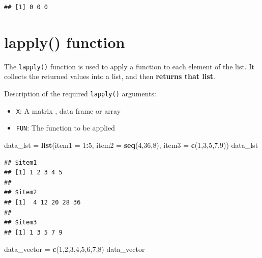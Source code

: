 \documentclass[
]{book}
\newenvironment{Shaded}{\begin{snugshade}}{\end{snugshade}}
\newcommand{\DataTypeTok}[1]{\textcolor[rgb]{0.13,0.29,0.53}{#1}}
\newcommand{\DecValTok}[1]{\textcolor[rgb]{0.00,0.00,0.81}{#1}}
\newcommand{\KeywordTok}[1]{\textcolor[rgb]{0.13,0.29,0.53}{\textbf{#1}}}
\newcommand{\NormalTok}[1]{#1}
\newcommand{\OperatorTok}[1]{\textcolor[rgb]{0.81,0.36,0.00}{\textbf{#1}}}
\newcommand{\StringTok}[1]{\textcolor[rgb]{0.31,0.60,0.02}{#1}}
\providecommand{\tightlist}{%
  \setlength{\itemsep}{0pt}\setlength{\parskip}{0pt}}
\begin{document}
\begin{verbatim}
## [1] 0 0 0
\end{verbatim}

\hypertarget{lapply-function}{%
\section{lapply() function}\label{lapply-function}}

The \texttt{lapply()} function is used to apply a function to each element of the list. It collects the returned values into a list, and then \textbf{returns that list}.

Description of the required \texttt{lapply()} arguments:

\begin{itemize}
\tightlist
\item
  \texttt{X}: A matrix , data frame or array
\item
  \texttt{FUN}: The function to be applied
\end{itemize}

\begin{Shaded}
\begin{Highlighting}[]
\NormalTok{data_lst =}\StringTok{ }\KeywordTok{list}\NormalTok{(}\DataTypeTok{item1 =} \DecValTok{1}\OperatorTok{:}\DecValTok{5}\NormalTok{,}
             \DataTypeTok{item2 =} \KeywordTok{seq}\NormalTok{(}\DecValTok{4}\NormalTok{,}\DecValTok{36}\NormalTok{,}\DecValTok{8}\NormalTok{),}
             \DataTypeTok{item3 =} \KeywordTok{c}\NormalTok{(}\DecValTok{1}\NormalTok{,}\DecValTok{3}\NormalTok{,}\DecValTok{5}\NormalTok{,}\DecValTok{7}\NormalTok{,}\DecValTok{9}\NormalTok{))}
\NormalTok{data_lst }
\end{Highlighting}
\end{Shaded}

\begin{verbatim}
## $item1
## [1] 1 2 3 4 5
## 
## $item2
## [1]  4 12 20 28 36
## 
## $item3
## [1] 1 3 5 7 9
\end{verbatim}

\begin{Shaded}
\begin{Highlighting}[]
\NormalTok{data_vector =}\StringTok{ }\KeywordTok{c}\NormalTok{(}\DecValTok{1}\NormalTok{,}\DecValTok{2}\NormalTok{,}\DecValTok{3}\NormalTok{,}\DecValTok{4}\NormalTok{,}\DecValTok{5}\NormalTok{,}\DecValTok{6}\NormalTok{,}\DecValTok{7}\NormalTok{,}\DecValTok{8}\NormalTok{)}
\NormalTok{data_vector}
\end{Highlighting}
\end{Shaded}
\end{document}
